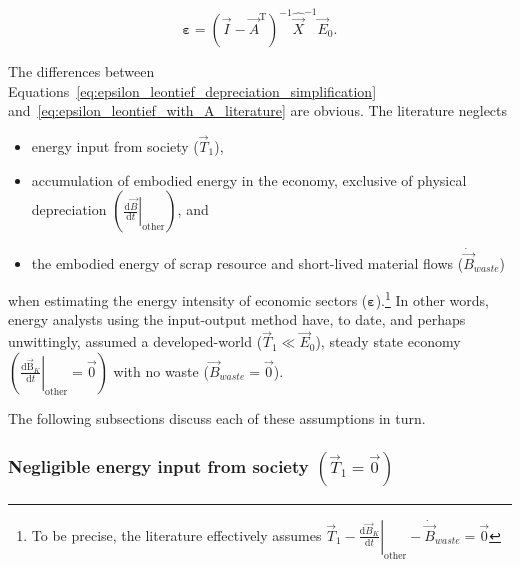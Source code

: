 \begin{equation} \label{eq:epsilon_leontief_with_A_literature}
	\bm{\varepsilon} 
	= {(\vec{I} - \vec{A}^{\mathrm{T}})}^{-1}
	\hat{\vec{X}}^{-1}
	\vec{E}_{0}.
\end{equation}

The differences between Equations~\ref{eq:epsilon_leontief_depreciation_simplification}
and~\ref{eq:epsilon_leontief_with_A_literature} are obvious. 
The literature neglects
\begin{itemize}
	\item{energy input from society ($\vec{T}_{1}$),}
	\item{accumulation of embodied energy in the economy,
			exclusive of physical depreciation 
			$\left( \left. \frac{\mathrm{d}\vec{B}}{\mathrm{d}t} \right|_{\mathrm{other}} \right)$,
			and}
	\item{the embodied energy of scrap resource	and short-lived material flows 
			($\dot{\vec{B}}_{waste}$)}
\end{itemize}

\noindent{}when estimating the energy intensity  
of economic sectors ($\bm{\varepsilon}$).\footnote{To be precise, 
the literature effectively assumes
$
	\vec{T}_{1}
	- \left. \frac{\mathrm{d}\vec{B}_{K}}{\mathrm{d}t} \right|_{\mathrm{other}}
	- \dot{\vec{B}}_{waste}
	= \vec{0}
$}
In other words, energy analysts using the input-output method
have, to date, and perhaps unwittingly, assumed 
a developed-world ($\vec{T}_{1} \ll \vec{E}_{0}$), 
steady state economy
$\left( \left. \frac{\mathrm{d}\mathrm{\vec{B}}_{K}}{\mathrm{d}t} \right|_{\mathrm{other}} 
= \vec{0} \right)$ with no waste ($\vec{B}_{waste} = \vec{0}$).

The following subsections discuss each of these assumptions in turn.


\subsubsection{Negligible energy input from society $\left( \vec{T}_{1} = \vec{0} \right)$}

